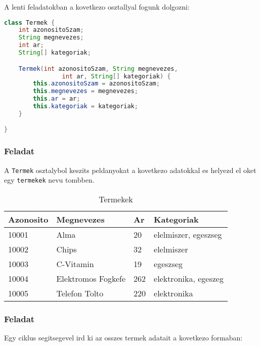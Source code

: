 \documentclass{article}
\let\l\lstinline
\begin{document}
A lenti feladatokban a kovetkezo osztallyal fogunk dolgozni:

\begin{lstlisting}[language=Java, caption=Feladat - Termek osztaly]
class Termek {
    int azonositoSzam;
    String megnevezes;
    int ar;
    String[] kategoriak;

    Termek(int azonositoSzam, String megnevezes,
                int ar, String[] kategoriak) {
        this.azonositoSzam = azonositoSzam;
        this.megnevezes = megnevezes;
        this.ar = ar;
        this.kategoriak = kategoriak;
    }

}

\end{lstlisting}

\subsubsection{Feladat}
A \l{Termek} osztalybol keszits peldanyokat a kovetkezo adatokkal es helyezd el oket egy \l{termekek} nevu tombben.

\begin{table}[H]
    \begin{tabular}{|l|l|l|l|}
        \hline
        \textbf{Azonosito} & \textbf{Megnevezes} & \textbf{Ar} & \textbf{Kategoriak}  \\ \hline
        10001              & Alma                & 20          & elelmiszer, egeszseg \\ \hline
        10002              & Chips               & 32          & elelmiszer           \\ \hline
        10003              & C-Vitamin           & 19          & egeszseg             \\ \hline
        10004              & Elektromos Fogkefe  & 262         & elektronika, egeszeg \\ \hline
        10005              & Telefon Tolto       & 220         & elektronika          \\ \hline
    \end{tabular}
    \caption{Termekek}
    \label{tab:termekek}
\end{table}

\newpage

\subsubsection{Feladat}

Egy ciklus segitsegevel ird ki az osszes termek adatait a kovetkezo formaban:
\end{document}
